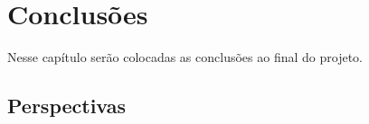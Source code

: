 \section{Conclusões}
Nesse capítulo serão colocadas as conclusões ao final do projeto.
\subsection{Perspectivas}
